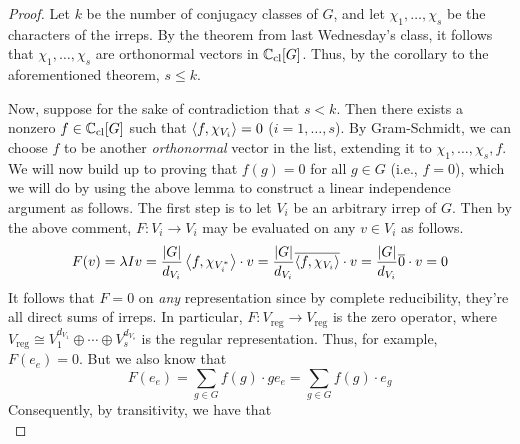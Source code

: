 \documentclass[../notes.tex]{subfiles}
\begin{document}
\begin{itemize}
\begin{proof}


        Let $k$ be the number of conjugacy classes of $G$, and let $\chi_1,\dots,\chi_s$ be the characters of the irreps. By the theorem from last Wednesday's class, it follows that $\chi_1,\dots,\chi_s$ are orthonormal vectors in $\mathbb{C}_\text{cl}[G]$. Thus, by the corollary to the aforementioned theorem, $s\leq k$.\par
        Now, suppose for the sake of contradiction that $s<k$. Then there exists a nonzero $f\in\mathbb{C}_\text{cl}[G]$ such that $\left\langle{f,\chi_{V_i}}\right\rangle=0$ ($i=1,\dots,s$). By Gram-Schmidt, we can choose $f$ to be another \emph{orthonormal} vector in the list, extending it to $\chi_1,\dots,\chi_s,f$. We will now build up to proving that $f(g)=0$ for all $g\in G$ (i.e., $f=0$), which we will do by using the above lemma to construct a linear independence argument as follows. The first step is to let $V_i$ be an arbitrary irrep of $G$. Then by the above comment, $F:V_i\to V_i$ may be evaluated on any $v\in V_i$ as follows.
        \begin{equation*}
            F(v) = \lambda Iv
            = \frac{|G|}{d_{V_i}}\left\langle{f,\chi_{V_i^*}}\right\rangle\cdot v
            = \frac{|G|}{d_{V_i}}\overline{\left\langle{f,\chi_{V_i}}\right\rangle}\cdot v
            = \frac{|G|}{d_{V_i}}\overline{0}\cdot v
            = 0
        \end{equation*}
        It follows that $F=0$ on \emph{any} representation since by complete reducibility, they're all direct sums of irreps. In particular, $F:V_\text{reg}\to V_\text{reg}$ is the zero operator, where $V_\text{reg}\cong V_1^{d_{V_1}}\oplus\cdots\oplus V_s^{d_{V_s}}$ is the regular representation. Thus, for example, $F(e_e)=0$. But we also know that
        \begin{equation*}
            F(e_e) = \sum_{g\in G}f(g)\cdot ge_e
            = \sum_{g\in G}f(g)\cdot e_g
        \end{equation*}
        Consequently, by transitivity, we have that
        \begin{equation*}

\end{equation*}
\end{proof}
\end{itemize}
\end{document}
